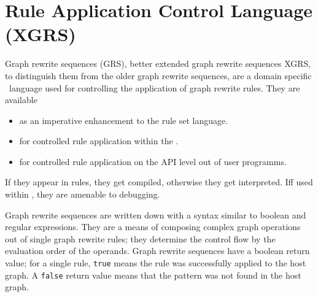 \chapter{Rule Application Control Language (XGRS)}
\label{cha:xgrs}

Graph rewrite sequences (GRS), better extended graph rewrite sequences XGRS, to distinguish them from the older graph rewrite sequences, are a domain specific \GrG~language used for controlling the application of graph rewrite rules. 
They are available
\begin{itemize}
\item as an imperative enhancement to the rule set language.
\item for controlled rule application within the \GrShell.
\item for controlled rule application on the API level out of user programms.
\end{itemize}

If they appear in rules, they get compiled, otherwise they get interpreted.
Iff used within \GrShell, they are amenable to debugging.

Graph rewrite sequences are written down with a syntax similar to boolean and regular expressions.
They are a means of composing complex graph operations out of single graph rewrite rules; 
they determine the control flow by the evaluation order of the operands.
Graph rewrite sequences have a boolean return value; for a single rule, \texttt{true} means the rule was successfully applied to the host graph.
A \texttt{false} return value means that the pattern was not found in the host graph.

